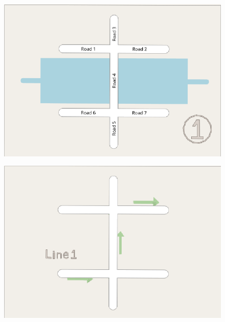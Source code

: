 \documentclass{beamer}
\begin{document}
\begin{frame}
	\begin{figure}[htpb]
		\centering
		\includegraphics[width=1\linewidth]{figure/plot1.png}
	\end{figure}
\end{frame}

\begin{frame}
	\begin{figure}[htpb]
		\centering
		\includegraphics[width=1\linewidth]{figure/line1.png}
	\end{figure}
\end{frame}
\end{document}
